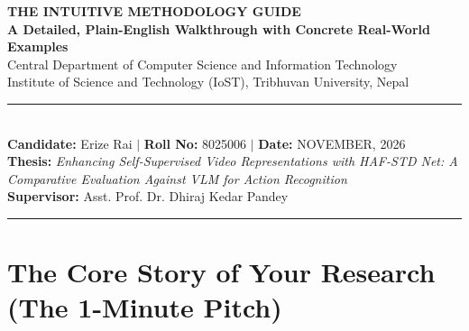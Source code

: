 \documentclass[a4paper, 11pt]{article}
\begin{document}
\begin{center}
  {\fontsize{18}{22}\selectfont \textbf{\color{primaryblue}THE INTUITIVE METHODOLOGY GUIDE}}\\[4pt]
  {\fontsize{12}{15}\selectfont \textbf{\color{accentdark}A Detailed, Plain-English Walkthrough with Concrete Real-World Examples}}\\[3pt]
  {\fontsize{10}{13}\selectfont Central Department of Computer Science and Information Technology}\\
  {\fontsize{10}{13}\selectfont Institute of Science and Technology (IoST), Tribhuvan University, Nepal}\\[5pt]
  \rule{\textwidth}{1.2pt}\\[4pt]
  \textbf{Candidate:} Erize Rai \quad$|$ \quad \textbf{Roll No:} 8025006 \quad$|$ \quad \textbf{Date:} NOVEMBER, 2026\\
  \textbf{Thesis:} \textit{Enhancing Self-Supervised Video Representations with HAF-STD Net: A Comparative Evaluation Against VLM for Action Recognition}\\
  \textbf{Supervisor:} Asst. Prof. Dr. Dhiraj Kedar Pandey\\
  \rule{\textwidth}{0.6pt}
\end{center}

\vspace{0.2cm}
\tableofcontents
\newpage

\section{The Core Story of Your Research (The 1-Minute Pitch)}
\end{document}

